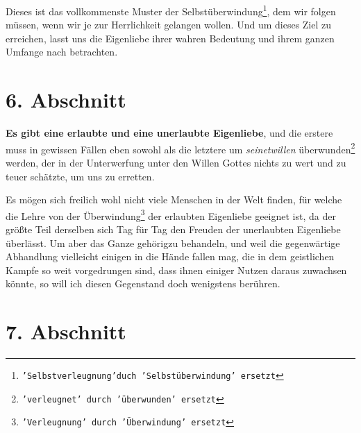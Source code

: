 \medskip

Dieses ist das vollkommenste Muster der
Selbstüberwindung\footnote{\texttt{'Selbstverleugnung'duch 'Selbstüberwindung'
ersetzt}}, dem wir
folgen
müssen, wenn wir je zur Herrlichkeit gelangen wollen. Und um dieses Ziel zu
erreichen, lasst uns die Eigenliebe ihrer wahren Bedeutung und ihrem ganzen
Umfange nach betrachten.

\section{6. Abschnitt} \label{kap4_ab6}

\textbf{Es gibt eine erlaubte und eine unerlaubte Eigenliebe}, und die erstere
muss in
gewissen Fällen eben sowohl als die letztere um \textit{seinetwillen}
überwunden\footnote{\texttt{'verleugnet' durch 'überwunden' ersetzt}}
werden, der in der Unterwerfung unter den Willen Gottes nichts zu wert und zu
teuer schätzte, um uns zu erretten.

Es mögen sich freilich wohl nicht viele Menschen in der Welt finden, für welche
die Lehre von der Überwindung\footnote{\texttt{'Verleugnung' durch 'Überwindung'
ersetzt}} der erlaubten Eigenliebe geeignet ist, da der
größte Teil derselben sich Tag für Tag den Freuden der unerlaubten
Eigenliebe überlässt. Um aber das Ganze gehörigzu behandeln, und weil die
gegenwärtige Abhandlung vielleicht einigen in die Hände fallen mag, die in dem
geistlichen Kampfe so weit vorgedrungen sind, dass ihnen einiger Nutzen daraus
zuwachsen könnte, so will ich diesen Gegenstand doch wenigstens berühren.

\section{7. Abschnitt} \label{kap4_ab7}

